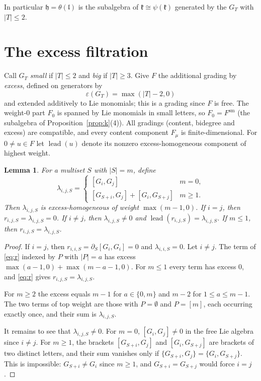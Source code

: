 \documentclass[11pt]{amsart}
\newtheorem{lemma}[theorem]{Lemma}
\theoremstyle{definition}
\theoremstyle{remark}
\newcommand{\h}{\mathfrak{h}}
\newcommand{\lie}{\mathfrak{l}}
\newcommand{\kr}{\mathfrak{k}}
\newcommand{\lead}{\operatorname{lead}}
\begin{document}
In particular $\h=\theta(\lie)$ is the subalgebra of $\kr\cong\psi(\kr)$ generated by the $G_T$ with $|T|\le2$.

\section{The excess filtration}\label{sec:filtration}

Call $G_T$ \emph{small} if $|T|\le2$ and \emph{big} if $|T|\ge3$. Give $F$ the additional grading by \emph{excess}, defined on generators by
\[
\varepsilon(G_T)=\max(|T|-2,0)
\]
and extended additively to Lie monomials; this is a grading since $F$ is free. The weight-$0$ part $F_0$ is spanned by Lie monomials in small letters, so $F_0=F^{\mathrm{sm}}$ (the subalgebra of Proposition~\ref{prop:k}(4)). All gradings (content, bidegree and excess) are compatible, and every content component $F_\mu$ is finite-dimensional. For $0\ne u\in F$ let $\lead(u)$ denote its nonzero excess-homogeneous component of highest weight.

\begin{lemma}\label{lem:lead}
For a multiset $S$ with $|S|=m$, define
\[
\lambda_{i,j,S}=
\begin{cases}
[G_i,G_j] & m=0,\\
[G_{S+i},G_j]+[G_i,G_{S+j}] & m\ge1.
\end{cases}
\]
Then $\lambda_{i,j,S}$ is excess-homogeneous of weight $\max(m-1,0)$. If $i=j$, then $r_{i,j,S}=\lambda_{i,j,S}=0$. If $i\neq j$, then $\lambda_{i,j,S}\neq0$ and $\lead(r_{i,j,S})=\lambda_{i,j,S}$. If $m\le1$, then $r_{i,j,S}=\lambda_{i,j,S}$.
\end{lemma}

\begin{proof}
If $i=j$, then $r_{i,i,S}=\partial_S[G_i,G_i]=0$ and $\lambda_{i,i,S}=0$. Let $i\ne j$. The term of \eqref{eq:r} indexed by $P$ with $|P|=a$ has excess $\max(a-1,0)+\max(m-a-1,0)$. For $m\le1$ every term has excess $0$, and \eqref{eq:r} gives $r_{i,j,S}=\lambda_{i,j,S}$.

For $m\ge2$ the excess equals $m-1$ for $a\in\{0,m\}$ and $m-2$ for $1\le a\le m-1$. The two terms of top weight are those with $P=\emptyset$ and $P=[m]$, each occurring exactly once, and their sum is $\lambda_{i,j,S}$.

It remains to see that $\lambda_{i,j,S}\neq0$. For $m=0$, $[G_i,G_j]\ne0$ in the free Lie algebra since $i\ne j$. For $m\ge1$, the brackets $[G_{S+i},G_j]$ and $[G_i,G_{S+j}]$ are brackets of two distinct letters, and their sum vanishes only if $\{G_{S+i},G_j\}=\{G_i,G_{S+j}\}$. This is impossible: $G_{S+i}\neq G_i$ since $m\ge1$, and $G_{S+i}=G_{S+j}$ would force $i=j$.
\end{proof}
\end{document}
